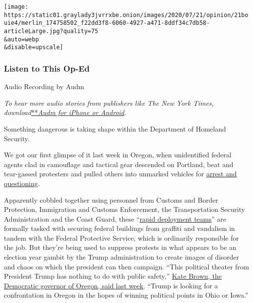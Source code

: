 \texttt{[image: https://static01.graylady3jvrrxbe.onion/images/2020/07/21/opinion/21bouie4/merlin\_174758502\_f22dd3f8-6060-4927-a471-8ddf34c7db58-articleLarge.jpg?quality=75\\\&auto=webp\\\&disable=upscale]}

\hypertarget{listen-to-this-op-ed}{%
\subsubsection{Listen to This Op-Ed}\label{listen-to-this-op-ed}}

Audio Recording by Audm

\emph{To hear more audio stories from publishers like The New York
Times,
download}\href{https://www.audm.com/?utm_source=nytmag\&utm_medium=embed\&utm_campaign=left_behind_draper}{**}\href{https://www.audm.com/?utm_source=nytopinion\&utm_medium=embed\&utm_campaign=border_war_portland}{\emph{Audm
for iPhone or Android}}\emph{.}

Something dangerous is taking shape within the Department of Homeland
Security.

We got our first glimpse of it last week in Oregon, when unidentified
federal agents clad in camouflage and tactical gear descended on
Portland, beat and tear-gassed protesters and pulled others into
unmarked vehicles for
\href{https://www.washingtonpost.com/nation/2020/07/17/portland-protests-federal-arrests/}{arrest
and questioning}.

Apparently cobbled together using personnel from Customs and Border
Protection, Immigration and Customs Enforcement, the Transportation
Security Administration and the Coast Guard, these
``\href{https://abcnews.go.com/Politics/dhs-launches-rapid-deployment-teams-federal-monuments-july/story?id=71552901}{rapid
deployment teams}'' are formally tasked with securing federal buildings
from graffiti and vandalism in tandem with the Federal Protective
Service, which is ordinarily responsible for the job. But they're being
used to suppress protests in what appears to be an election year gambit
by the Trump administration to create images of disorder and chaos on
which the president can then campaign. ``This political theater from
President Trump has nothing to do with public safety,''
\href{https://www.wweek.com/news/2020/07/16/oregon-gov-kate-brown-says-president-trump-is-invading-portland-as-an-election-stunt/}{Kate
Brown, the Democratic governor of Oregon, said last week}. ``Trump is
looking for a confrontation in Oregon in the hopes of winning political
points in Ohio or Iowa.''

